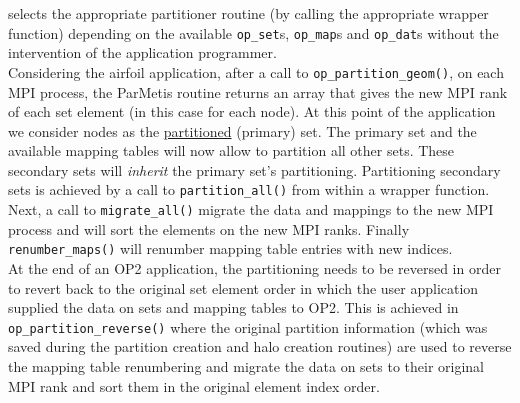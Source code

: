\documentclass[12pt]{article}
\begin{document}
selects the appropriate partitioner routine (by calling the appropriate wrapper function) depending on the available
\texttt{op\_set}s, \texttt{op\_map}s and \texttt{op\_dat}s without the intervention of the application programmer.\\
\indent Considering the airfoil application, after a call to \texttt{op\_partition\_geom()}, on each MPI process, the
ParMetis routine returns an array that gives the new MPI rank of each set element (in this case for each node). At this
point of the application we consider nodes as the \underline{partitioned} (primary) set. The primary set and the
available mapping tables will now allow to partition all other sets. These secondary sets will \textit{inherit} the
primary set's partitioning. Partitioning secondary sets is achieved by a call to \texttt{partition\_all()} from within a
wrapper function. Next, a call to \texttt{migrate\_all()} migrate the data and mappings to the new MPI process and will
sort the elements on the new MPI ranks.  Finally \texttt{renumber\_maps()} will renumber mapping table entries with new
indices. \\
\indent At the end of an OP2 application, the partitioning needs to be reversed in order to revert back to the original
set element order in which the user application supplied the data on sets and mapping tables to OP2. This is achieved in
\texttt{op\_partition\_reverse()} where the original partition information (which was saved during the partition
creation and halo creation routines) are used to reverse the mapping table renumbering and migrate the data on sets to
their original MPI rank and sort them in the original element index order. 




\end{document}
